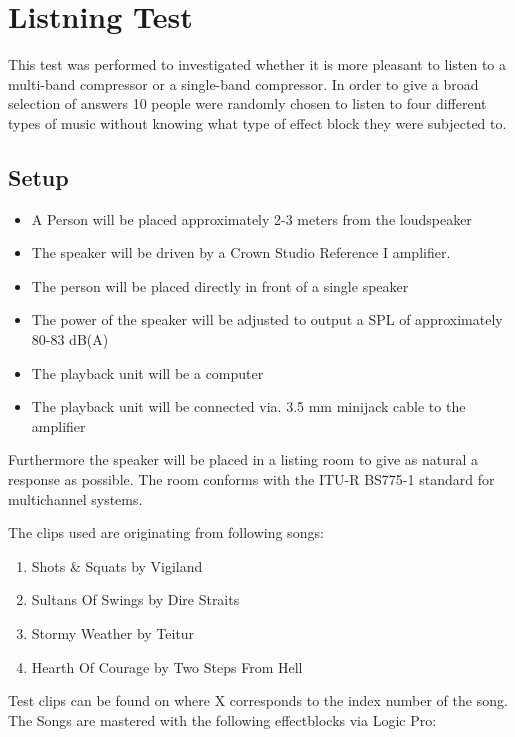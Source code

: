 \chapter{Listning Test}\label{app:journal_ListningTest}

This test was performed to investigated whether it is more pleasant to listen to a multi-band compressor or a single-band compressor. In order to give a broad selection of answers 10 people were randomly chosen to listen to four different types of music without knowing what type of effect block they were subjected to.


\section{Setup}



\begin{itemize}\addtolength{\itemsep}{-.35\baselineskip} 
\item A Person will be placed approximately 2-3 meters from the loudspeaker
\item The speaker will be driven by a Crown Studio Reference I amplifier.
\item The person will be placed directly in front of a single speaker
\item The power of the speaker will be adjusted to output a \gls{SPL} of approximately 80-83 dB(A)
\item The playback unit will be a computer
\item The playback unit will be connected via. 3.5 mm minijack cable to the amplifier
\end{itemize}
\vspace{-5mm}
Furthermore the speaker will be placed in a listing room to give as natural a response as possible. The room conforms with the ITU-R BS775-1 standard for multichannel systems.

The clips used are originating from following songs:
\vspace{-5mm}
\begin{enumerate}\addtolength{\itemsep}{-.35\baselineskip} 
\item Shots \& Squats by Vigiland
\item Sultans Of Swings by Dire Straits
\item Stormy Weather by Teitur
\item Hearth Of Courage by Two Steps From Hell
\end{enumerate}
Test clips can be found on  where X corresponds to the index number of the song.
The Songs are mastered with the following effectblocks via Logic Pro:


